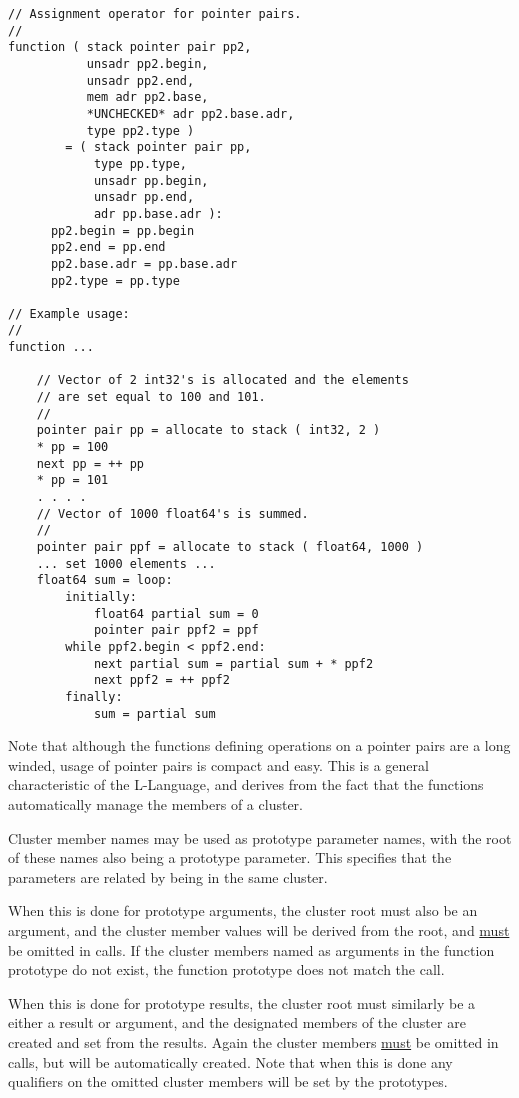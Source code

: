 \documentclass[12pt]{article}
\newenvironment{indpar}[1][0.3in]%
	{\begin{list}{}%
		     {\setlength{\itemsep}{0in}%
		      \setlength{\topsep}{0in}%
		      \setlength{\parsep}{1ex}%
		      \setlength{\labelwidth}{#1}%
		      \setlength{\leftmargin}{#1}%
		      \addtolength{\leftmargin}{\labelsep}}%
	 \item}%
	{\end{list}}
\begin{document}
\begin{indpar}
\begin{verbatim}
// Assignment operator for pointer pairs.
//
function ( stack pointer pair pp2,
           unsadr pp2.begin,
           unsadr pp2.end,
           mem adr pp2.base,
           *UNCHECKED* adr pp2.base.adr,
           type pp2.type )
        = ( stack pointer pair pp,
            type pp.type,
            unsadr pp.begin,
            unsadr pp.end,
            adr pp.base.adr ):
      pp2.begin = pp.begin
      pp2.end = pp.end
      pp2.base.adr = pp.base.adr
      pp2.type = pp.type

// Example usage:
//
function ...

    // Vector of 2 int32's is allocated and the elements
    // are set equal to 100 and 101.
    //
    pointer pair pp = allocate to stack ( int32, 2 )
    * pp = 100
    next pp = ++ pp
    * pp = 101
    . . . .
    // Vector of 1000 float64's is summed.
    //
    pointer pair ppf = allocate to stack ( float64, 1000 )
    ... set 1000 elements ...
    float64 sum = loop:
        initially:
            float64 partial sum = 0
            pointer pair ppf2 = ppf
        while ppf2.begin < ppf2.end:
            next partial sum = partial sum + * ppf2
            next ppf2 = ++ ppf2
        finally:
            sum = partial sum
\end{verbatim}\end{indpar}

Note that although the functions defining operations on a pointer pairs
are a long winded, usage of pointer pairs is compact and easy.
This is a general characteristic of the L-Language, and derives
from the fact that the functions automatically manage the members
of a cluster.

Cluster member names may be used as prototype parameter
names, with the root of these names also being a prototype
parameter.  This specifies that the parameters are related
by being in the same cluster.

When this is done for prototype arguments, the cluster root must
also be an argument, and the cluster member values
will be derived from the root, and \underline{must}
be omitted in calls.  If the cluster members named as arguments
in the function prototype do not exist,
the function prototype does not match the call.

When this is done for prototype results, the cluster root must similarly
be a either a result or argument, and the designated
members of the cluster are created and set from the results.
Again the cluster members \underline{must} be omitted in calls,
but will be automatically created.
Note that when this is done any qualifiers on the omitted cluster
members will be set by the prototypes.
\end{document}
